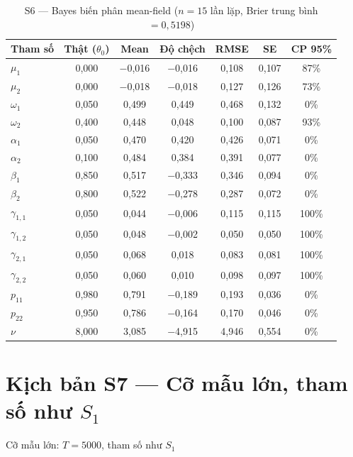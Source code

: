 \documentclass[11pt,a4paper]{article}
\begin{document}
\begin{table}[H]\centering\scriptsize
\caption{S6 --- Bayes biến phân mean-field ($n=15$ lần lặp, Brier trung bình $=0{,}5198$)}
\begin{tabularx}{\textwidth}{l C C C C C C}
\toprule
\textbf{Tham số} & \textbf{Thật ($\theta_0$)} & \textbf{Mean} & \textbf{Độ chệch} & \textbf{RMSE} & \textbf{SE} & \textbf{CP 95\%} \\
\midrule
$\mu_1$ & 0{,}000 & $-$0{,}016 & $-$0{,}016 & 0{,}108 & 0{,}107 & 87\% \\
$\mu_2$ & 0{,}000 & $-$0{,}018 & $-$0{,}018 & 0{,}127 & 0{,}126 & 73\% \\
$\omega_1$ & 0{,}050 & 0{,}499 & 0{,}449 & 0{,}468 & 0{,}132 & 0\% \\
$\omega_2$ & 0{,}400 & 0{,}448 & 0{,}048 & 0{,}100 & 0{,}087 & 93\% \\
$\alpha_1$ & 0{,}050 & 0{,}470 & 0{,}420 & 0{,}426 & 0{,}071 & 0\% \\
$\alpha_2$ & 0{,}100 & 0{,}484 & 0{,}384 & 0{,}391 & 0{,}077 & 0\% \\
$\beta_1$ & 0{,}850 & 0{,}517 & $-$0{,}333 & 0{,}346 & 0{,}094 & 0\% \\
$\beta_2$ & 0{,}800 & 0{,}522 & $-$0{,}278 & 0{,}287 & 0{,}072 & 0\% \\
$\gamma_{1,1}$ & 0{,}050 & 0{,}044 & $-$0{,}006 & 0{,}115 & 0{,}115 & 100\% \\
$\gamma_{1,2}$ & 0{,}050 & 0{,}048 & $-$0{,}002 & 0{,}050 & 0{,}050 & 100\% \\
$\gamma_{2,1}$ & 0{,}050 & 0{,}068 & 0{,}018 & 0{,}083 & 0{,}081 & 100\% \\
$\gamma_{2,2}$ & 0{,}050 & 0{,}060 & 0{,}010 & 0{,}098 & 0{,}097 & 100\% \\
$p_{11}$ & 0{,}980 & 0{,}791 & $-$0{,}189 & 0{,}193 & 0{,}036 & 0\% \\
$p_{22}$ & 0{,}950 & 0{,}786 & $-$0{,}164 & 0{,}170 & 0{,}046 & 0\% \\
$\nu$ & 8{,}000 & 3{,}085 & $-$4{,}915 & 4{,}946 & 0{,}554 & 0\% \\
\bottomrule
\end{tabularx}
\end{table}

\bigskip
\section*{Kịch bản S7 --- Cỡ mẫu lớn, tham số như $S_1$}
Cỡ mẫu lớn: $T=5000$, tham số như $S_1$
\end{document}
